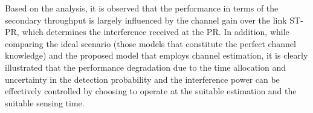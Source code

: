 Based on the analysis, it is observed that the performance in terms of the secondary throughput is largely influenced by the channel gain over the link ST-PR, which determines the interference received at the PR. In addition, while comparing the ideal scenario (those models that constitute the perfect channel knowledge) and the proposed model that employs channel estimation, it is clearly illustrated that the performance degradation due to the time allocation and uncertainty in the detection probability and the interference power can be effectively controlled by choosing to operate at the suitable estimation and the suitable sensing time. 


